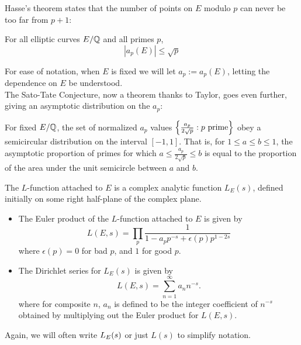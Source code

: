 Hasse's theorem states that the number of points on $E$ modulo $p$ can never be too far from $p+1$:
\begin{theorem}[Hasse, 1936]
For all elliptic curves $E/\mathbb{Q}$ and all primes $p$,
\begin{equation}
|a_p(E)| \le \sqrt{p}
\end{equation}
\end{theorem}

For ease of notation, when $E$ is fixed we will let $a_p := a_p(E)$, letting the dependence on $E$ be understood. \\

The Sato-Tate Conjecture, now a theorem thanks to Taylor, goes even further, giving an asymptotic distribution on the $a_p$:
\begin{theorem}[Taylor, 2006-]
For fixed $E/\mathbb{Q}$, the set of normalized $a_p$ values $\left\{\frac{a_p}{2\sqrt{p}}: p \text{ prime}\right\}$ obey a semicircular distribution on the interval $[-1,1]$. That is, for $1\le a \le b \le 1$, the asymptotic proportion of primes for which $a \le \frac{a_p}{2\sqrt{p}} \le b$ is equal to the proportion of the area under the unit semicircle between $a$ and $b$.
\end{theorem}

\begin{definition} \mbox{}

The $L$-function attached to $E$ is a complex analytic function $L_E(s)$, defined initially on some right half-plane of the complex plane.
\begin{itemize}
\item The Euler product of the $L$-function attached to $E$ is given by
\begin{equation}
L(E,s) = \prod_{p} \frac{1}{1 - a_p p^{-s} + \epsilon(p)p^{1-2s}}
\end{equation}
where $\epsilon(p) = 0$ for bad $p$, and $1$ for good $p$.
\item The Dirichlet series for $L_E(s)$ is given by
\begin{equation}
L(E,s) = \sum_{n=1}^{\infty} a_n n^{-s}.
\end{equation}
where for composite $n$, $a_n$ is defined to be the integer coefficient of $n^{-s}$ obtained by multiplying out the Euler product for $L(E,s)$.
\end{itemize}
\end{definition}
Again, we will often write $L_E(s)$ or just $L(s)$ to simplify notation. \\

